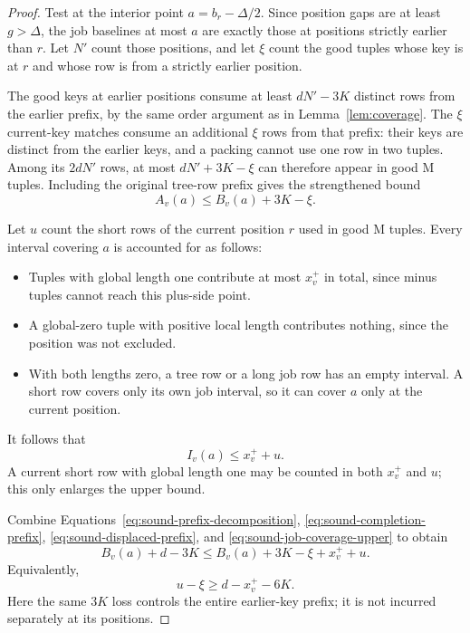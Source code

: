 \begin{proof}
Test at the interior point \(a=b_r-\Delta/2\).
Since position gaps are at least \(g>\Delta\), the job baselines
at most \(a\) are exactly those at positions strictly earlier than
\(r\).  Let \(N'\) count those positions, and let \(\xi\) count
the good tuples whose key is at \(r\) and whose row is from a
strictly earlier position.

The good keys at earlier positions consume at least \(dN'-3K\)
distinct rows from the earlier prefix, by the same order argument
as in Lemma~\ref{lem:coverage}.  The \(\xi\) current-key matches
consume an additional \(\xi\) rows from that prefix: their keys
are distinct from the earlier keys, and a packing cannot use one
row in two tuples.  Among its \(2dN'\) rows, at most
\(dN'+3K-\xi\) can therefore appear in good \(\mathrm M\) tuples.
Including the original tree-row prefix gives the strengthened bound
\begin{equation}\label{eq:sound-displaced-prefix}
 A_v(a)\le B_v(a)+3K-\xi.
\end{equation}

Let \(u\) count the short rows of the current position \(r\) used
in good \(\mathrm M\) tuples.  Every interval covering \(a\)
is accounted for as follows:
\begin{itemize}
 \item Tuples with global length one contribute at most \(x_v^+\)
 in total, since minus tuples cannot reach this plus-side point.
 \item A global-zero tuple with positive local length contributes
 nothing, since the position was not excluded.
 \item With both lengths zero, a tree row or a long job row has
 an empty interval.  A short row covers only its own job interval,
 so it can cover \(a\) only at the current position.
\end{itemize}
It follows that
\begin{equation}\label{eq:sound-job-coverage-upper}
 I_v(a)\le x_v^++u.
\end{equation}
A current short row with global length one may be counted in
both \(x_v^+\) and \(u\); this only enlarges the upper bound.

Combine Equations~\eqref{eq:sound-prefix-decomposition},
\eqref{eq:sound-completion-prefix},
\eqref{eq:sound-displaced-prefix}, and
\eqref{eq:sound-job-coverage-upper} to obtain
\[
 B_v(a)+d-3K
 \le B_v(a)+3K-\xi+x_v^++u.
\]
Equivalently,
\begin{equation}\label{eq:sound-xi-correction}
 u-\xi\ge d-x_v^+-6K.
\end{equation}
Here the same \(3K\) loss controls the entire earlier-key prefix;
it is not incurred separately at its positions.


\end{proof}
